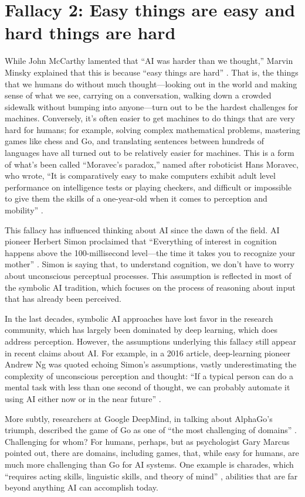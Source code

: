 \documentclass{article}
\begin{document}
\section*{Fallacy 2: Easy things are easy and hard things are hard}
While John McCarthy lamented that ``AI was harder than we thought,'' Marvin Minsky explained that this is because ``easy things are hard'' \cite{Minsky1987}.  That is, the things that we humans do without much thought---looking out in the world and making sense of what we see, carrying on a conversation, walking down a crowded sidewalk without bumping into anyone---turn out to be the hardest challenges for machines. Conversely, it's often easier to get machines to do things that are very hard for humans; for example, solving complex mathematical problems, mastering games like chess and Go, and translating sentences between hundreds of languages have all turned out to be relatively easier for machines.  This is a form of what's been called ``Moravec's paradox,'' named after roboticist Hans Moravec, who wrote, ``It is comparatively easy to make computers exhibit adult level performance on intelligence tests or playing checkers, and difficult or impossible to give them the skills of a one-year-old when it comes to perception and mobility'' \cite{Moravec1988a}.

This fallacy has influenced thinking about AI since the dawn of the field. AI pioneer Herbert Simon proclaimed that ``Everything of interest in cognition happens above the 100-millisecond level---the time it takes you to recognize your mother'' \cite{Hofstadter1985}.  Simon is saying that, to understand cognition, we don't have to worry about unconscious perceptual processes.  This assumption is reflected in most of the symbolic AI tradition, which focuses on the process of reasoning about input that has already been perceived. 

In the last decades, symbolic AI approaches have lost favor in the research community, which has largely been dominated by deep learning, which does address perception.  However, the assumptions underlying this fallacy still appear in recent claims about AI.  For example, in a 2016 article, deep-learning pioneer Andrew Ng was quoted echoing Simon's assumptions, vastly underestimating the complexity of unconscious perception and thought: ``If a typical person can do a mental task with less than one second of thought, we can probably automate it using AI either now or in the near future'' \cite{Ng2016}.

More subtly, researchers at Google DeepMind, in talking about AlphaGo's triumph, described the game of Go as one of ``the most challenging of domains'' \cite{Silver2017}.  Challenging for whom?  For humans, perhaps, but as psychologist Gary Marcus pointed out, there are domains, including games, that, while easy for humans, are much more challenging than Go for AI systems.  One example is charades, which ``requires acting skills, linguistic skills, and theory of mind'' \cite{Marcus2018}, abilities that are far beyond anything AI can accomplish today. 
\end{document}
